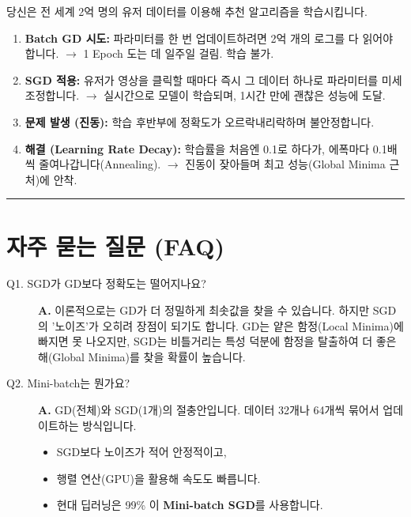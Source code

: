 \documentclass[11pt,a4paper]{book}
\theoremstyle{definition}
\begin{document}
\begin{storybox}[title={Scenario: 수억 명의 시청 기록 학습}]
당신은 전 세계 2억 명의 유저 데이터를 이용해 추천 알고리즘을 학습시킵니다.
\end{storybox}

\begin{enumerate}
    \item \textbf{Batch GD 시도:}
    파라미터를 한 번 업데이트하려면 2억 개의 로그를 다 읽어야 합니다.
    $\rightarrow$ 1 Epoch 도는 데 일주일 걸림. 학습 불가.
    
    \item \textbf{SGD 적용:}
    유저가 영상을 클릭할 때마다 즉시 그 데이터 하나로 파라미터를 미세 조정합니다.
    $\rightarrow$ 실시간으로 모델이 학습되며, 1시간 만에 괜찮은 성능에 도달.
    
    \item \textbf{문제 발생 (진동):}
    학습 후반부에 정확도가 오르락내리락하며 불안정합니다.
    
    \item \textbf{해결 (Learning Rate Decay):}
    학습률을 처음엔 0.1로 하다가, 에폭마다 0.1배씩 줄여나갑니다(Annealing).
    $\rightarrow$ 진동이 잦아들며 최고 성능(Global Minima 근처)에 안착.
\end{enumerate}

\vspace{0.5cm}\hrule\vspace{0.5cm}

\section{자주 묻는 질문 (FAQ)}

\begin{description}
    \item[Q1. SGD가 GD보다 정확도는 떨어지나요?]
    \textbf{A.} 이론적으로는 GD가 더 정밀하게 최솟값을 찾을 수 있습니다. 하지만 SGD의 '노이즈'가 오히려 장점이 되기도 합니다. GD는 얕은 함정(Local Minima)에 빠지면 못 나오지만, SGD는 비틀거리는 특성 덕분에 함정을 탈출하여 더 좋은 해(Global Minima)를 찾을 확률이 높습니다.
    
    \item[Q2. Mini-batch는 뭔가요?]
    \textbf{A.} GD(전체)와 SGD(1개)의 절충안입니다. 데이터 32개나 64개씩 묶어서 업데이트하는 방식입니다.
    \begin{itemize}
        \item SGD보다 노이즈가 적어 안정적이고,
        \item 행렬 연산(GPU)을 활용해 속도도 빠릅니다.
        \item 현대 딥러닝은 99\% 이 \textbf{Mini-batch SGD}를 사용합니다.
    \end{itemize}
\end{description}
\end{document}
